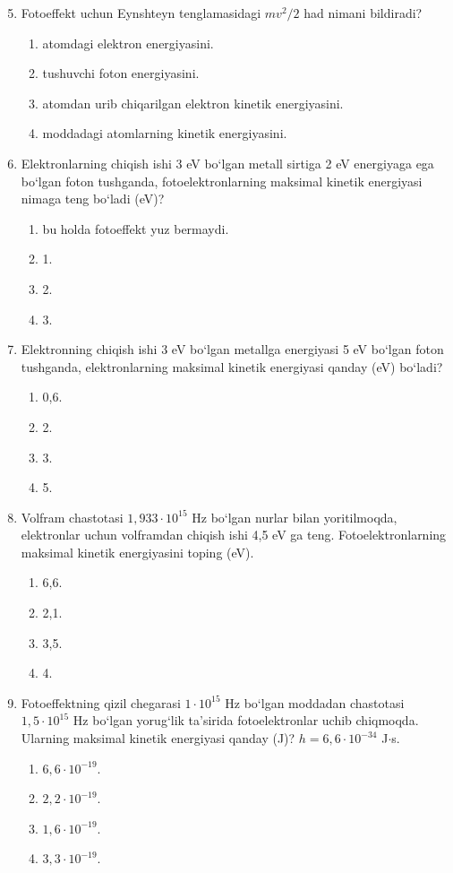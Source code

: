 \begin{enumerate}
\setcounter{enumi}{4}
\item Fotoeffekt uchun Eynshteyn tenglamasidagi $mv^2/2$ had nimani bildiradi?
\begin{enumerate}[label=\Alph*)]
\item atomdagi elektron energiyasini.
\item tushuvchi foton energiyasini.
\item atomdan urib chiqarilgan elektron kinetik energiyasini.
\item moddadagi atomlarning kinetik energiyasini.
\end{enumerate}

\item Elektronlarning chiqish ishi 3 eV bo‘lgan metall sirtiga 2 eV energiyaga ega bo‘lgan foton tushganda, fotoelektronlarning maksimal kinetik energiyasi nimaga teng bo‘ladi (eV)?
\begin{enumerate}[label=\Alph*)]
\item bu holda fotoeffekt yuz bermaydi.
\item 1.
\item 2.
\item 3.
\end{enumerate}

\item Elektronning chiqish ishi 3 eV bo‘lgan metallga energiyasi 5 eV bo‘lgan foton tushganda, elektronlarning maksimal kinetik energiyasi qanday (eV) bo‘ladi?
\begin{enumerate}[label=\Alph*)]
\item 0,6.
\item 2.
\item 3.
\item 5.
\end{enumerate}

\item Volfram chastotasi $1,933\cdot 10^{15}$ Hz bo‘lgan nurlar bilan yoritilmoqda, elektronlar uchun volframdan chiqish ishi 4,5 eV ga teng. Fotoelektronlarning maksimal kinetik energiyasini toping (eV).
\begin{enumerate}[label=\Alph*)]
\item 6,6.
\item 2,1.
\item 3,5.
\item 4.
\end{enumerate}

\item Fotoeffektning qizil chegarasi $1\cdot 10^{15}$ Hz bo‘lgan moddadan chastotasi $1,5\cdot 10^{15}$ Hz bo‘lgan yorug‘lik ta’sirida fotoelektronlar uchib chiqmoqda. Ularning maksimal kinetik energiyasi qanday (J)? $h=6,6\cdot 10^{-34}$ J$\cdot$s.
\begin{enumerate}[label=\Alph*)]
\item $6,6\cdot 10^{-19}$.
\item $2,2\cdot 10^{-19}$.
\item $1,6\cdot 10^{-19}$.
\item $3,3\cdot 10^{-19}$.
\end{enumerate}


\end{enumerate}
